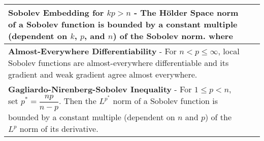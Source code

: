 \begin{longtable}{|*{3}{>{\centering\arraybackslash}p{}|}}
            \\[6pt] \hline
                        
            \textbf{Sobolev Embedding for $kp > n$} - The H\"{o}lder Space norm of a Sobolev function is bounded by a constant multiple (dependent on $k$, $p$, and $n$) of the Sobolev norm. \newline {$\!\begin{gathered} \norm{u}_{\mathcal{C}^{k - \qty[\frac{n}{p}] - 1, \gamma}(\Rl^n)} \leq C \norm{u}_{W^{k,p}(\Rl^n)} \end{gathered}$} \newline where \newline {$\!\begin{gathered} \gamma = \begin{cases}\qty[\dfrac{n}{p}] + 1 - \dfrac{n}{p} & \text{ if } \dfrac{n}{p} \not\in \mathbb{N},\\[0.4cm] \text{any } \alpha \in \Rl \cap (0,1) & \text{ if } \dfrac{n}{p} \in \mathbb{N}.\end{cases} \end{gathered}$}
            &
            
            \\[6pt] \hline

            \textbf{Almost-Everywhere Differentiability} - For $n < p \leq \infty$, local Sobolev functions are almost-everywhere differentiable and its gradient and weak gradient agree almost everywhere.
            &
            
            \\[6pt] \hline
            
            \textbf{Gagliardo-Nirenberg-Sobolev Inequality} - For $1 \leq p < n$, set $p^* = \dfrac{np}{n - p}$.  Then the $L^{p^*}$ norm of a Sobolev function is bounded by a constant multiple (dependent on $n$ and $p$) of the $L^p$ norm of its derivative. \newline {$\!\begin{gathered} \norm{u}_{L^{p^*}(\Rl^n)} \leq C\norm{Du}_{L^p(\Rl^n)} \end{gathered}$}
            &
            
            \\[6pt] \hline
            

    \bottomrule
\end{longtable}